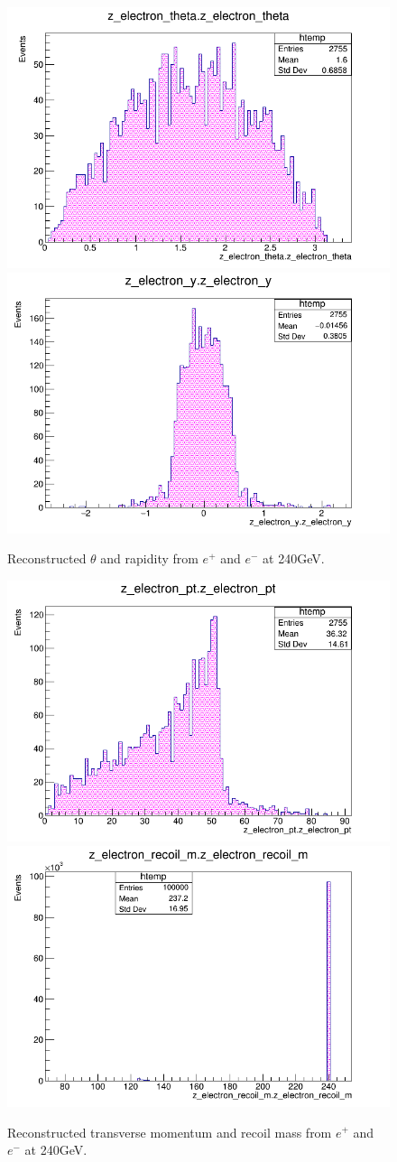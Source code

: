 \begin{figure}[ht!]
    \centering
    \includegraphics[width=0.5\linewidth]{plots/plots/z_e_theta.png}\hfill
    \includegraphics[width=0.5\linewidth]{plots/plots/z_e_y.png}
    \caption{Reconstructed $\theta$ and rapidity  from  $e^{+}$ and $e^{-}$ at 240GeV.}
\end{figure}    

\begin{figure}[ht!]
    \centering
    \includegraphics[width=0.5\linewidth]{plots/plots/z_e_pt.png}\hfill
    \includegraphics[width=0.5\linewidth]{plots/plots/z_e_recoil_m.png}
    \caption{Reconstructed transverse momentum and recoil mass  from  $e^{+}$ and $e^{-}$ at 240GeV.}
\end{figure}

